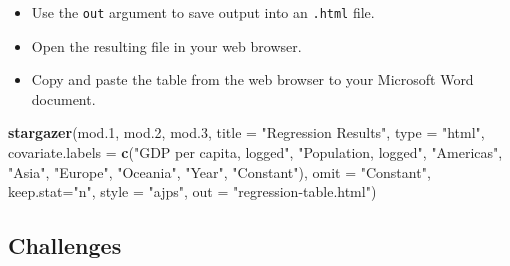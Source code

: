 \documentclass[]{book}
\newenvironment{Shaded}{\begin{snugshade}}{\end{snugshade}}
\newcommand{\KeywordTok}[1]{\textcolor[rgb]{0.13,0.29,0.53}{\textbf{#1}}}
\newcommand{\DataTypeTok}[1]{\textcolor[rgb]{0.13,0.29,0.53}{#1}}
\newcommand{\DecValTok}[1]{\textcolor[rgb]{0.00,0.00,0.81}{#1}}
\newcommand{\StringTok}[1]{\textcolor[rgb]{0.31,0.60,0.02}{#1}}
\newcommand{\NormalTok}[1]{#1}
\providecommand{\tightlist}{%
  \setlength{\itemsep}{0pt}\setlength{\parskip}{0pt}}
\begin{document}
\begin{itemize}
\tightlist
\item
  Use the \texttt{out} argument to save output into an \texttt{.html}
  file.
\item
  Open the resulting file in your web browser.
\item
  Copy and paste the table from the web browser to your Microsoft Word
  document.
\end{itemize}

\begin{Shaded}
\begin{Highlighting}[]
\KeywordTok{stargazer}\NormalTok{(mod.}\DecValTok{1}\NormalTok{, mod.}\DecValTok{2}\NormalTok{, mod.}\DecValTok{3}\NormalTok{, }\DataTypeTok{title =} \StringTok{"Regression Results"}\NormalTok{, }\DataTypeTok{type =} \StringTok{"html"}\NormalTok{, }
          \DataTypeTok{covariate.labels  =} \KeywordTok{c}\NormalTok{(}\StringTok{"GDP per capita, logged"}\NormalTok{, }\StringTok{"Population, logged"}\NormalTok{, }\StringTok{"Americas"}\NormalTok{, }\StringTok{"Asia"}\NormalTok{, }\StringTok{"Europe"}\NormalTok{, }\StringTok{"Oceania"}\NormalTok{, }\StringTok{"Year"}\NormalTok{, }\StringTok{"Constant"}\NormalTok{), }
          \DataTypeTok{omit =} \StringTok{"Constant"}\NormalTok{, }
          \DataTypeTok{keep.stat=}\StringTok{"n"}\NormalTok{, }\DataTypeTok{style =} \StringTok{"ajps"}\NormalTok{,}
          \DataTypeTok{out =} \StringTok{"regression-table.html"}\NormalTok{)}
\end{Highlighting}
\end{Shaded}

\subsection{Challenges}\label{challenges-14}
\end{document}
